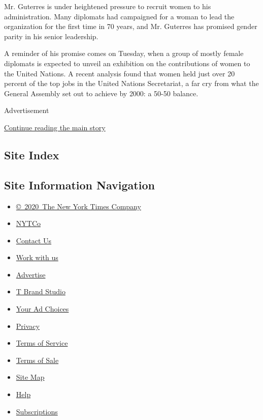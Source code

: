 Mr. Guterres is under heightened pressure to recruit women to his
administration. Many diplomats had campaigned for a woman to lead the
organization for the first time in 70 years, and Mr. Guterres has
promised gender parity in his senior leadership.

A reminder of his promise comes on Tuesday, when a group of mostly
female diplomats is expected to unveil an exhibition on the
contributions of women to the United Nations. A recent analysis found
that women held just over 20 percent of the top jobs in the United
Nations Secretariat, a far cry from what the General Assembly set out to
achieve by 2000: a 50-50 balance.

Advertisement

\protect\hyperlink{after-bottom}{Continue reading the main story}

\hypertarget{site-index}{%
\subsection{Site Index}\label{site-index}}

\hypertarget{site-information-navigation}{%
\subsection{Site Information
Navigation}\label{site-information-navigation}}

\begin{itemize}
\tightlist
\item
  \href{https://help.nytimes.com/hc/en-us/articles/115014792127-Copyright-notice}{©~2020~The
  New York Times Company}
\end{itemize}

\begin{itemize}
\tightlist
\item
  \href{https://www.nytco.com/}{NYTCo}
\item
  \href{https://help.nytimes.com/hc/en-us/articles/115015385887-Contact-Us}{Contact
  Us}
\item
  \href{https://www.nytco.com/careers/}{Work with us}
\item
  \href{https://nytmediakit.com/}{Advertise}
\item
  \href{http://www.tbrandstudio.com/}{T Brand Studio}
\item
  \href{https://www.nytimes.com/privacy/cookie-policy\#how-do-i-manage-trackers}{Your
  Ad Choices}
\item
  \href{https://www.nytimes.com/privacy}{Privacy}
\item
  \href{https://help.nytimes.com/hc/en-us/articles/115014893428-Terms-of-service}{Terms
  of Service}
\item
  \href{https://help.nytimes.com/hc/en-us/articles/115014893968-Terms-of-sale}{Terms
  of Sale}
\item
  \href{https://spiderbites.nytimes.com}{Site Map}
\item
  \href{https://help.nytimes.com/hc/en-us}{Help}
\item
  \href{https://www.nytimes.com/subscription?campaignId=37WXW}{Subscriptions}
\end{itemize}
